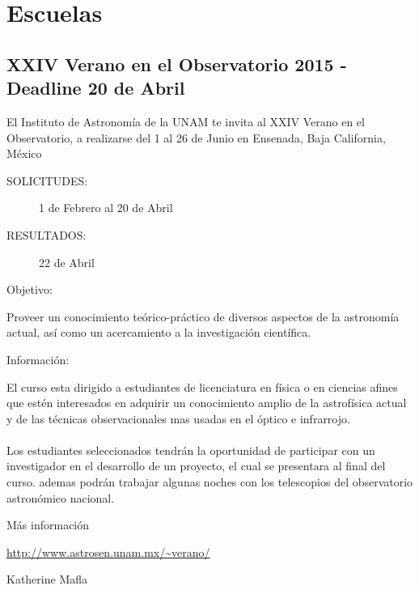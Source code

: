 \documentclass{book}
\begin{document}
\newpage
                   \section*{Escuelas}

\subsection{XXIV Verano en el Observatorio 2015 - Deadline 20 de Abril}
El Instituto de Astronomía de la UNAM te invita al XXIV Verano en el Observatorio, a realizarse del 1 al 26 de Junio en Ensenada, Baja California, México

\begin{description}
\item[SOLICITUDES:] 1 de Febrero al 20 de Abril

\item[RESULTADOS:] 22 de Abril

\item[Objetivo:]
\end{description}
Proveer un conocimiento teórico-práctico de diversos aspectos de la astronomía actual, así como un acercamiento a la investigación científica.
\begin{description}
\item[Información:]
\end{description}
El curso esta dirigido a estudiantes de licenciatura en física o en ciencias afines que estén interesados en adquirir un conocimiento amplio de la astrofísica actual y de las técnicas observacionales mas usadas en el óptico e infrarrojo.\\
\\
Los estudiantes seleccionados tendrán la oportunidad de participar con un investigador en el desarrollo de un proyecto, el cual se presentara al final del curso. ademas podrán trabajar algunas noches con los telescopios del observatorio astronómico nacional.

Más información 
\begin{center}
\url{http://www.astrosen.unam.mx/~verano/}
\end{center}
\begin{flushright}
Katherine Mafla
\end{flushright}
\end{document}
